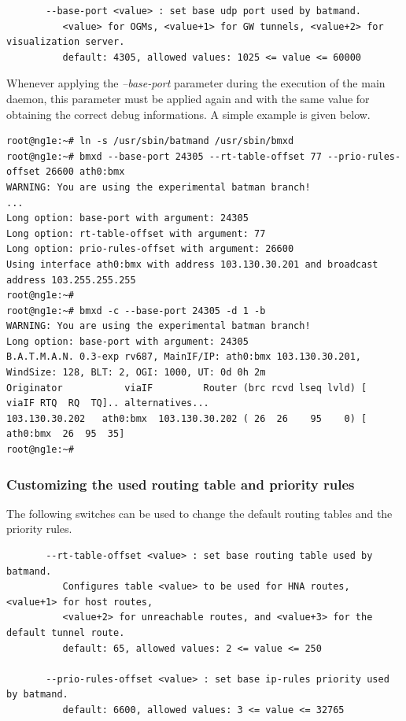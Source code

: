 \documentclass[11pt]{article}
\begin{document}
\begin{small} \begin{verbatim}
       --base-port <value> : set base udp port used by batmand.
          <value> for OGMs, <value+1> for GW tunnels, <value+2> for visualization server.
          default: 4305, allowed values: 1025 <= value <= 60000
\end{verbatim} \end{small}

Whenever applying the \emph{--base-port} parameter during the execution of the main daemon, this parameter must be applied again and with the same value for obtaining the correct debug informations. A simple example is given below.

\begin{small} \begin{verbatim}
root@ng1e:~# ln -s /usr/sbin/batmand /usr/sbin/bmxd
root@ng1e:~# bmxd --base-port 24305 --rt-table-offset 77 --prio-rules-offset 26600 ath0:bmx
WARNING: You are using the experimental batman branch!
...
Long option: base-port with argument: 24305
Long option: rt-table-offset with argument: 77
Long option: prio-rules-offset with argument: 26600
Using interface ath0:bmx with address 103.130.30.201 and broadcast address 103.255.255.255
root@ng1e:~#
root@ng1e:~# bmxd -c --base-port 24305 -d 1 -b
WARNING: You are using the experimental batman branch!
Long option: base-port with argument: 24305
B.A.T.M.A.N. 0.3-exp rv687, MainIF/IP: ath0:bmx 103.130.30.201, WindSize: 128, BLT: 2, OGI: 1000, UT: 0d 0h 2m
Originator           viaIF         Router (brc rcvd lseq lvld) [    viaIF RTQ  RQ  TQ].. alternatives...
103.130.30.202   ath0:bmx  103.130.30.202 ( 26  26    95    0) [ ath0:bmx  26  95  35]
root@ng1e:~#

\end{verbatim} \end{small}

\subsubsection{Customizing the used routing table and priority rules}

The following switches can be used to change the default routing tables and the priority rules. 

\begin{small} \begin{verbatim}
       --rt-table-offset <value> : set base routing table used by batmand.
          Configures table <value> to be used for HNA routes, <value+1> for host routes,
          <value+2> for unreachable routes, and <value+3> for the default tunnel route.
          default: 65, allowed values: 2 <= value <= 250

       --prio-rules-offset <value> : set base ip-rules priority used by batmand.
          default: 6600, allowed values: 3 <= value <= 32765
\end{verbatim} \end{small}
\end{document}
